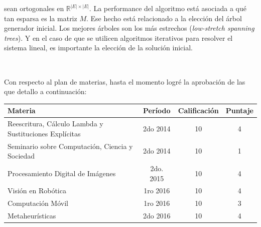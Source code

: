 \documentclass{article}
\begin{document}
sean ortogonales en $\mathbb{R}^{|E| \times |E|}$. 
La performance del algoritmo está asociada a qué tan esparsa es la matriz 
$M$. Ese hecho está relacionado a la elección del árbol generador inicial. 
Los mejores árboles son los más estrechos (\emph{low-stretch spanning trees}). 
Y en el caso de que se utilicen algoritmos iterativos para resolver el sistema 
lineal, es importante la elección de la solución inicial.


\

Con respecto al plan de materias, hasta el momento logré la aprobación de 
las que detallo a continuación:

\hfill

\centering
\begin{tabular}{l c c c}

\textsf{Materia} & \textsf{Período} & \textsf{Calificación} & \textsf{Puntaje}\\
\hline
Reescritura, Cálculo Lambda y Sustituciones Explícitas & 2do 2014 & 10 & 4\\
Seminario sobre Computación, Ciencia y Sociedad & 2do 2014 & 10 & 1\\
Procesamiento Digital de Imágenes & 2do. 2015 & 10  & 4 \\
Visión en Robótica & 1ro 2016 & 10 & 4 \\ 
Computación Móvil & 1ro 2016 & 10 & 3 \\ 
Metaheurísticas & 2do 2016 & 10 & 4 \\ 
\hline
\end{tabular}



\end{document}

